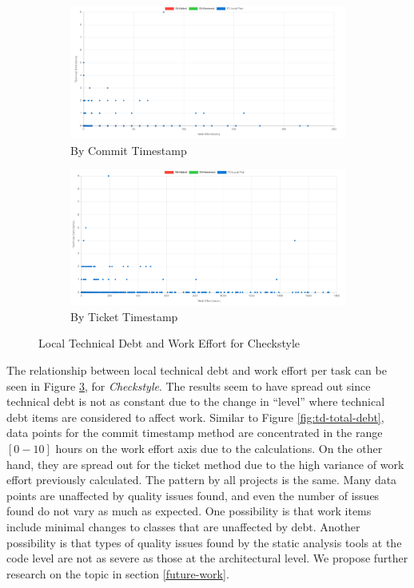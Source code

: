 \documentclass{mpaper}
\begin{document}
\begin{figure}
	\centering
	\begin{subfigure}{.45\textwidth}
		\includegraphics[width=\linewidth]{images/checkstyle_local_debt_commit.png}
		\caption{By Commit Timestamp}
		\label{fig:collections-td-timeline}
	\end{subfigure}
	\begin{subfigure}{.45\textwidth}
		\includegraphics[width=\linewidth]{images/checkstyle_local_debt_ticket.png}
		\caption{By Ticket Timestamp}
		\label{fig:spring-td-timeline}
	\end{subfigure}
	\caption{Local Technical Debt and Work Effort for Checkstyle}
	\label{fig:td-local-debt}
\end{figure}

The relationship between local technical debt and work effort per task can be
seen in Figure \ref{fig:td-local-debt}, for \emph{Checkstyle}. The results seem
to have spread out since technical debt is not as constant due to the change in
``level'' where technical debt items are considered to affect work. Similar to
Figure \ref{fig:td-total-debt}, data points for the commit timestamp method are
concentrated in the range $[0-10]$ hours on the work effort axis due to the
calculations. On the other hand, they are spread out for the ticket method due
to the high variance of work effort previously calculated. The pattern by all
projects is the same. Many data points are unaffected by quality issues found,
and even the number of issues found do not vary as much as expected. One
possibility is that work items include minimal changes to classes that are
unaffected by debt. Another possibility is that types of quality issues found by
the static analysis tools at the code level are not as severe as those at the
architectural level. We propose further research on the topic in section
\ref{future-work}. 
\end{document}
